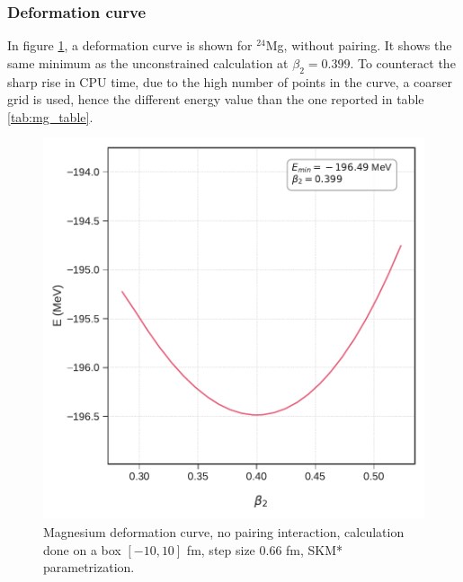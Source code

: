 \subsubsection{Deformation curve}
In figure \ref{fig:mg_no_pair_deformation}, a deformation curve is shown for $^{24}$Mg, without pairing. It shows the same minimum as the unconstrained calculation at $\beta_2=0.399$. To counteract the sharp rise in CPU time, due to the high number of points in the curve, a coarser grid is used, hence the different energy value than the one reported in table \ref{tab:mg_table}.
\begin{figure}[h]
  \centering
  \includegraphics[width=0.8\linewidth]{Images/mg_nopair_curve.pdf}
  \caption{Magnesium deformation curve, no pairing interaction, calculation done on a box $[-10, 10]$ fm, step size 0.66 fm, SKM* parametrization.}
  \label{fig:mg_no_pair_deformation}
\end{figure}